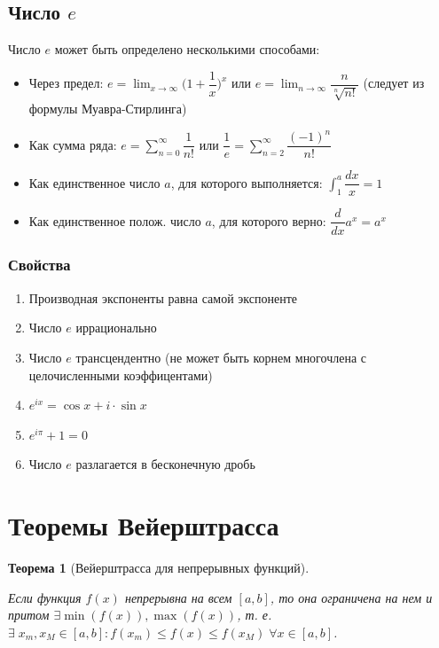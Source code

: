 \documentclass[a4paper,12pt]{extbook}
\newcommand{\newpar}{$ $\par\nobreak\ignorespaces}
\theoremstyle{numbered}
\theoremstyle{named}
\newtheorem*{theorem}{Теорема}
\theoremstyle{named}
\theoremstyle{named}
\begin{document}
\subsection*{Число \(e\)}
Число \(e\) может быть определено несколькими способами:
\begin{itemize}
    \item {Через предел: \(e = \lim_{x \to \infty}{\Big(1 + \dfrac{1}{x}\Big)^x}\) или \(e = \lim_{n \to \infty}{\dfrac{n}{\sqrt[n]{n!}}}\) (следует из формулы Муавра-Стирлинга)}

    \item {Как сумма ряда: \(e = \displaystyle{\sum_{n = 0}^{\infty}{\dfrac{1}{n!}}}\) или \(\dfrac{1}{e} = \displaystyle{\sum_{n = 2}^{\infty}{\dfrac{(-1)^n}{n!}}}\) }

    \item {Как единственное число \(a\), для которого выполняется: \(\displaystyle{\int_{1}^{a}{\dfrac{dx}{x}} = 1}\)}

    \item {Как единственное полож. число \(a\), для которого верно: \(\dfrac{d}{dx}a^x = a^x\)}
\end{itemize}

\subsubsection*{Свойства}
\begin{enumerate}
    \item {Производная экспоненты равна самой экспоненте}
    \item {Число \(e\) иррационально}
    \item {Число \(e\) трансцендентно (не может быть корнем многочлена с целочисленными коэффицентами)}
    \item {\(e^{ix} = \cos{x} + i \cdot \sin{x}\)}
    \item {\(e^{i\pi} + 1 = 0\)}
    \item {Число \(e\) разлагается в бесконечную дробь}
\end{enumerate}

\section{Теоремы Вейерштрасса}%
\label{sec:Теоремы Вейерштрасса}

\begin{theorem}[Вейерштрасса для непрерывных функций]
    \newpar
    Если функция \(f(x)\) непрерывна на всем \([a, b]\), то она ограничена на нем и притом \(\exists \min{(f(x))}, \max{(f(x))}\), т. е. \(\exists \; x_m, x_M \in [a, b]: f(x_m) \leq f(x) \leq f(x_M) \; \forall x \in [a, b]\).
\end{theorem}
\end{document}
